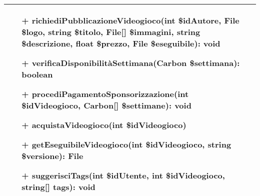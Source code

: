 \begin{tabular}{|| l | p{28em} ||}
\begin{itemize}
		\item[+] richiediPubblicazioneVideogioco(int \$idAutore, File \$logo, string \$titolo, File[] \$immagini, string \$descrizione, float \$prezzo, File \$eseguibile): void
		\item[+] verificaDisponibilitàSettimana(Carbon \$settimana): boolean
		\item[+] procediPagamentoSponsorizzazione(int \$idVideogioco, Carbon[] \$settimane): void
		\item[+] acquistaVideogioco(int \$idVideogioco)
		\item[+] getEseguibileVideogioco(int \$idVideogioco, string \$versione): File
		\item[+] suggerisciTags(int \$idUtente, int \$idVideogioco, string[] tags): void
	\end{itemize}\\
	\hline
\end{tabular}

\newpage
